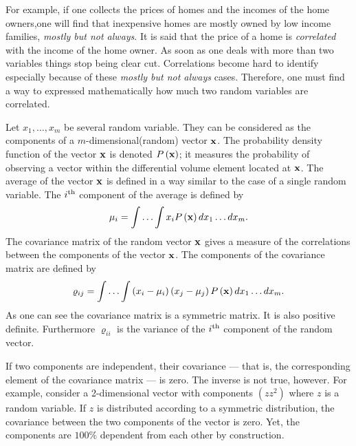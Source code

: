 \documentclass[twoside]{book}
\begin{document}
For example, if one collects the prices of homes and the incomes
of the home owners,one will find that inexpensive homes are mostly
owned by low income families, {\sl mostly but not always}. It is
said that the price of a home is {\sl correlated} with the income
of the home owner. As soon as one deals with more than two
variables things stop being clear cut. Correlations become hard to
identify especially because of these {\sl mostly but not always}
cases. Therefore, one must find a way to expressed mathematically
how much two random variables are correlated.

Let $x_1,\ldots,x_m$ be several random variable. They can be
considered as the components of a $m$-dimensional(random) vector
${\bf x}$. The probability density function of the vector ${\bf
x}$ is denoted $P\left({\bf x}\right)$; it measures the
probability of observing a vector within the differential volume
element located at ${\bf x}$. The average of the vector ${\bf x}$
is defined in a way similar to the case of a single random
variable. The $i^{\mathop{\rm th}}$ component of the average is defined by
\begin{equation}
 \mu_i=\int\ldots\int x_i P\left({\bf x}\right)dx_1\ldots dx_m.
\end{equation}
The covariance matrix of the random vector ${\bf x}$ gives a
measure of the correlations between the components of the vector
${\bf x}$. The components of the covariance matrix are defined by
\begin{equation}
 \varrho_{ij}=\int\ldots\int \left(x_i-\mu_i\right)\left(x_j-\mu_j\right)
  P\left({\bf x}\right)dx_1\ldots dx_m.
\end{equation}
As one can see the covariance matrix is a symmetric matrix. It is
also positive definite. Furthermore $\varrho_{ii}$ is the variance
of the $i^{\mathop{\rm th}}$ component of the random vector.


If two components are independent, their covariance --- that is,
the corresponding element of the covariance matrix --- is zero.
The inverse is not true, however. For example, consider a
2-dimensional vector with components $\left(z z^2\right)$ where
$z$ is a random variable. If $z$ is distributed according to a
symmetric distribution, the covariance between the two components
of the vector is zero. Yet, the components are $100\%$ dependent
from each other by construction.
\end{document}

